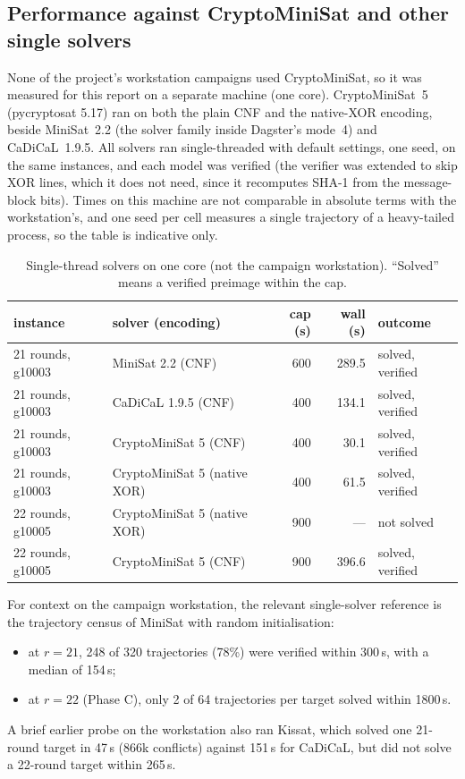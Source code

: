 \documentclass[11pt,a4paper]{article}
\begin{document}
\subsection{Performance against CryptoMiniSat and other single solvers}\label{sec:cms}

None of the project's workstation campaigns used CryptoMiniSat, so it was measured for this report on a
separate machine (one core). CryptoMiniSat~5 (pycryptosat 5.17) ran on both the plain CNF and the
native-XOR encoding, beside MiniSat~2.2 (the solver family inside Dagster's mode~4) and CaDiCaL~1.9.5.
All solvers ran single-threaded with default settings, one seed, on the same instances, and each
model was verified (the verifier was extended to skip XOR lines, which it does not need, since it
recomputes SHA-1 from the message-block bits). Times on this machine are not comparable in absolute terms with the workstation's, and one
seed per cell measures a single trajectory of a heavy-tailed process, so the table is indicative
only.

\begin{table}[h]\centering\small
\begin{tabular}{@{}llrrl@{}}
\toprule
\textbf{instance} & \textbf{solver (encoding)} & \textbf{cap (s)} & \textbf{wall (s)} & \textbf{outcome}\\
\midrule
21 rounds, g10003 & MiniSat 2.2 (CNF) & 600 & 289.5 & solved, verified\\
21 rounds, g10003 & CaDiCaL 1.9.5 (CNF) & 400 & 134.1 & solved, verified\\
21 rounds, g10003 & CryptoMiniSat 5 (CNF) & 400 & 30.1 & solved, verified\\
21 rounds, g10003 & CryptoMiniSat 5 (native XOR) & 400 & 61.5 & solved, verified\\
22 rounds, g10005 & CryptoMiniSat 5 (native XOR) & 900 & --- & not solved\\
22 rounds, g10005 & CryptoMiniSat 5 (CNF) & 900 & 396.6 & solved, verified\\
\bottomrule
\end{tabular}
\caption{Single-thread solvers on one core (not the campaign workstation). ``Solved'' means a verified preimage within
the cap.}
\label{tab:cms}
\end{table}

For context on the campaign workstation, the relevant single-solver reference is the trajectory census of MiniSat with
random initialisation:
\begin{itemize}
\item at $r=21$, 248 of 320 trajectories (78\%) were verified within 300\,s, with a median of 154\,s;
\item at $r=22$ (Phase C), only 2 of 64 trajectories per target solved within 1800\,s.
\end{itemize}
A brief earlier probe on the workstation also ran Kissat, which solved one 21-round target in 47\,s (866k
conflicts) against 151\,s for CaDiCaL, but did not solve a 22-round target within 265\,s.
\end{document}
